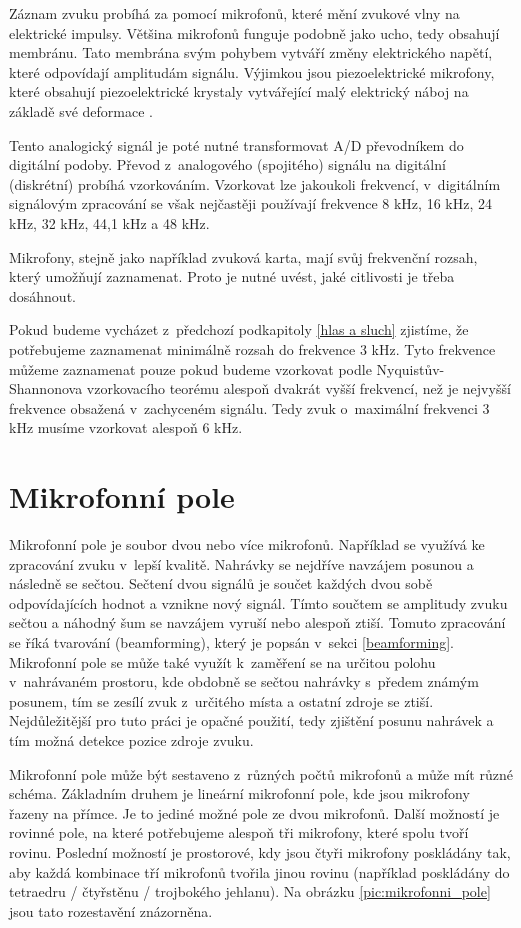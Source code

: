 Záznam zvuku probíhá za pomocí mikrofonů, které mění zvukové vlny na elektrické impulsy. Většina mikrofonů funguje podobně jako ucho, tedy obsahují membránu. Tato membrána svým pohybem vytváří změny elektrického napětí, které odpovídají amplitudám signálu. Výjimkou jsou piezoelektrické mikrofony, které obsahují piezoelektrické krystaly vytvářející malý elektrický náboj na základě své deformace \cite{mikrofony}.

Tento analogický signál je poté nutné transformovat A/D převodníkem do digitální podoby. Převod z~analogového (spojitého) signálu na digitální (diskrétní) probíhá vzorkováním. Vzorkovat lze jakoukoli frekvencí, v~digitálním signálovým zpracování se však nejčastěji používají frekvence 8 kHz, 16 kHz, 24 kHz, 32 kHz, 44,1 kHz a 48 kHz.

Mikrofony, stejně jako například zvuková karta, mají svůj frekvenční rozsah, který umožňují zaznamenat. Proto je nutné uvést, jaké citlivosti je třeba dosáhnout.

Pokud budeme vycházet z~předchozí podkapitoly \ref{hlas a sluch} zjistíme, že potřebujeme zaznamenat minimálně rozsah do frekvence 3 kHz. Tyto frekvence můžeme zaznamenat pouze pokud budeme vzorkovat podle Nyquistův-Shannonova vzorkovacího teorému \cite{teorem} alespoň dvakrát vyšší frekvencí, než je nejvyšší frekvence obsažená v~zachyceném signálu. Tedy zvuk o~maximální frekvenci 3 kHz musíme vzorkovat alespoň 6 kHz.

\section{Mikrofonní pole}

Mikrofonní pole je soubor dvou nebo více mikrofonů. Například se využívá ke zpracování zvuku v~lepší kvalitě. Nahrávky se nejdříve navzájem posunou a následně se sečtou. Sečtení dvou signálů je součet každých dvou sobě odpovídajících hodnot a vznikne nový signál. Tímto součtem se amplitudy zvuku sečtou a náhodný šum se navzájem vyruší nebo alespoň ztiší. Tomuto zpracování se říká tvarování (beamforming), který je popsán v~sekci \ref{beamforming}. Mikrofonní pole se může také využít k~zaměření se na určitou polohu v~nahrávaném prostoru, kde obdobně se sečtou nahrávky s~předem známým posunem, tím se zesílí zvuk z~určitého místa a ostatní zdroje se ztiší. Nejdůležitější pro tuto práci je opačné použití, tedy zjištění posunu nahrávek a tím možná detekce pozice zdroje zvuku.

Mikrofonní pole může být sestaveno z~různých počtů mikrofonů a může mít různé schéma. Základním druhem je lineární mikrofonní pole, kde jsou mikrofony řazeny na přímce. Je to jediné možné pole ze dvou mikrofonů. Další možností je rovinné pole, na které potřebujeme alespoň tři mikrofony, které spolu tvoří rovinu. Poslední možností je prostorové, kdy jsou čtyři mikrofony poskládány tak, aby každá kombinace tří mikrofonů tvořila jinou rovinu (například poskládány do tetraedru / čtyřstěnu / trojbokého jehlanu). Na obrázku \ref{pic:mikrofonni_pole} jsou tato rozestavění znázorněna.


